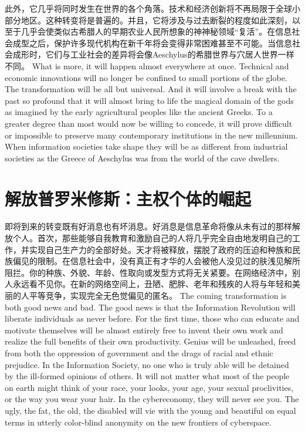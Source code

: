 \begin{paracol}{2}[]
\switchcolumn*
此外，它几乎将同时发生在世界的各个角落。技术和经济创新将不再局限于全球小部分地区。这种转变将是普遍的。并且，它将涉及与过去断裂的程度如此深刻，以至于几乎会使类似古希腊人的早期农业人民所想象的神神秘领域“复活”。在信息社会成型之后，保护许多现代机构在新千年将会变得非常困难甚至不可能。当信息社会成形时，它们与工业社会的差异将会像Aeschylus的希腊世界与穴居人世界一样不同。
\switchcolumn
What is more, it will happen almost everywhere at once. Technical and economic innovations will no longer be confined to small portions of the globe. The transformation will be all but universal. And it will involve a break with the past so profound that it will almost bring to life the magical domain of the gods as imagined by the early agricultural peoples like the ancient Greeks. To a greater degree than most would now be willing to concede, it will prove difficult or impossible to preserve many contemporary institutions in the new millennium. When information societies take shape they will be as different from industrial societies as the Greece of Aeschylus was from the world of the cave dwellers.
\end{paracol}

\section{解放普罗米修斯：主权个体的崛起}
\begin{paracol}{2}[]
即将到来的转变既有好消息也有坏消息。好消息是信息革命将像从未有过的那样解放个人。首次，那些能够自我教育和激励自己的人将几乎完全自由地发明自己的工作，并实现自己生产力的全部好处。天才将被释放，摆脱了政府的压迫和种族和民族偏见的限制。在信息社会中，没有真正有才华的人会被他人没见过的肤浅见解所阻拦。你的种族、外貌、年龄、性取向或发型方式将无关紧要。在网络经济中，别人永远看不见你。在新的网络空间上，丑陋、肥胖、老年和残疾的人将与年轻和美丽的人平等竞争，实现完全无色觉偏见的匿名。
\switchcolumn
The coming transformation is both good news and bad. The good news is that the Information Revolution will liberate individuals as never before. For the first time, those who can educate and motivate themselves will be almost entirely free to invent their own work and realize the full benefits of their own productivity. Genius will be unleashed, freed from both the oppression of government and the drags of racial and ethnic prejudice. In the Information Society, no one who is truly able will be detained by the ill-formed opinions of others. It will not matter what most of the people on earth might think of your race, your looks, your age, your sexual proclivities, or the way you wear your hair. In the cybereconomy, they will never see you. The ugly, the fat, the old, the disabled will vie with the young and beautiful on equal terms in utterly color-blind anonymity on the new frontiers of cyberspace.
\end{paracol}

